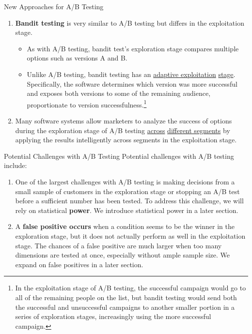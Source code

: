 \documentclass[pdf]{beamer}
\newcommand{\empr}[1]{{\color{franklinblue}\textbf{#1}}}
\theoremstyle{remark}
\theoremstyle{definition}
\begin{document}
\begin{frame}[t]{New Approaches for A/B Testing}
\begin{enumerate}
\item \empr{Bandit testing} is very similar to A/B testing but differs in the exploitation stage.  
\begin{itemize}
\item As with A/B testing, bandit test's exploration stage compares multiple options such as versions A and B. 
\item Unlike A/B testing, bandit testing has an \underline{adaptive exploitation} \underline{stage}. Specifically, the software determines which version was more successful and exposes both versions to some of the remaining audience, proportionate to version successfulness.\footnote{In the exploitation stage of A/B testing, the successful campaign would go to all of the remaining people on the list, but bandit testing would send both the successful and unsuccessful campaigns to another smaller portion in a series of exploration stages, increasingly using the more successful campaign.}
\end{itemize}
\item Many software systems allow marketers to analyze the success of options during the exploration stage of A/B testing \underline{across} \underline{different segments} by applying the results intelligently across segments in the exploitation stage.
\end{enumerate}
\end{frame}

\begin{frame}[t]{Potential Challenges with A/B Testing}
Potential challenges with A/B testing include:\\
\vspace{1.5ex}
\small
\begin{enumerate}
\item One of the largest challenges with A/B testing is making decisions from a small sample of customers in the exploration stage or stopping an A/B test before a sufficient number has been tested.  To address this challenge, we will rely on statistical \empr{power}.  We introduce statistical power in a later section. 
\item  A \empr{false positive occurs} when a condition seems to be the winner in the exploration stage, but it does not actually perform as well in the exploitation stage. The chances of a false positive are much larger when too many dimensions are tested at once, especially without ample sample size.  We expand on false positives in a later section.
\end{enumerate}
\end{frame}
\end{document}
